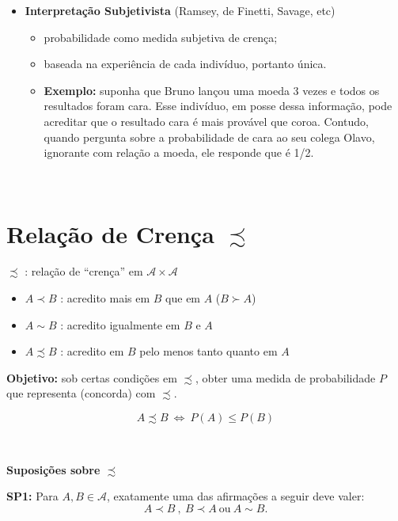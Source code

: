 \documentclass[
]{book}
\providecommand{\tightlist}{%
  \setlength{\itemsep}{0pt}\setlength{\parskip}{0pt}}
\begin{document}
\begin{itemize}
\tightlist
\item
  \textbf{Interpretação Subjetivista} (Ramsey, de Finetti, Savage, etc)

  \begin{itemize}
  \tightlist
  \item
    probabilidade como medida subjetiva de crença;
  \item
    baseada na experiência de cada indivíduo, portanto única.
  \item
    \textbf{Exemplo:} suponha que Bruno lançou uma moeda 3 vezes e todos os resultados foram cara. Esse indivíduo, em posse dessa informação, pode acreditar que o resultado cara é mais provável que coroa. Contudo, quando pergunta sobre a probabilidade de cara ao seu colega Olavo, ignorante com relação a moeda, ele responde que é 1/2.
  \end{itemize}
\end{itemize}

\(~\)

\hypertarget{relauxe7uxe3o-de-crenuxe7a-precsim}{%
\section{\texorpdfstring{Relação de Crença \(\precsim\)}{Relação de Crença \textbackslash precsim}}\label{relauxe7uxe3o-de-crenuxe7a-precsim}}

\(\precsim\) : relação de ``crença'' em \(\mathcal{A}\times\mathcal{A}\)

\begin{itemize}
\tightlist
\item
  \(A \prec B\) : acredito mais em \(B\) que em \(A\) (\(B \succ A\))
\item
  \(A \sim B\) : acredito igualmente em \(B\) e \(A\)
\item
  \(A \precsim B\) : acredito em \(B\) pelo menos tanto quanto em \(A\)
\end{itemize}

\textbf{Objetivo:} sob certas condições em \(\precsim\), obter uma medida de probabilidade \(P\) que representa (concorda) com \(\precsim\).

\[A \precsim B ~ \Longleftrightarrow ~ P(A) \leq P(B)\]

\(~\)

\textbf{Suposições sobre \(\precsim\)}

\textbf{SP1:} Para \(A, B \in \mathcal{A}\), exatamente uma das afirmações a seguir deve valer:\\
\[A \prec B ~,~ B \prec A ~\textrm{ou}~ A \sim B.\]
\end{document}
